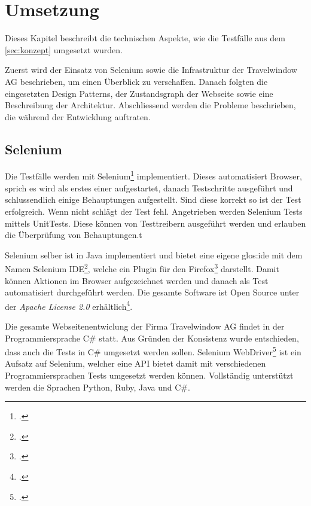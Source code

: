 

\chapter{Umsetzung}
\label{sec:umsetzung}

Dieses Kapitel beschreibt die technischen Aspekte, wie die Testfälle aus dem \cref{sec:konzept}  umgesetzt wurden.

Zuerst wird der Einsatz von Selenium sowie die Infrastruktur der Travelwindow AG beschrieben, um einen Überblick zu verschaffen. Danach folgten die eingesetzten Design Patterns, der Zustandsgraph der Webseite sowie eine Beschreibung der Architektur. Abschliessend werden die Probleme beschrieben, die während der Entwicklung auftraten.

\section{Selenium}
\label{sec:umsetzung:selenium}
Die Testfälle werden mit Selenium\footcite{Selenium_-_Web_Browser_Automation_2015-09-26} implementiert. Dieses automatisiert Browser, sprich es wird als erstes einer aufgestartet, danach Testschritte ausgeführt und schlussendlich einige Behauptungen aufgestellt. Sind diese korrekt so ist der Test erfolgreich. Wenn nicht schlägt der Test fehl. 
Angetrieben werden Selenium Tests mittels UnitTests. Diese können von Testtreibern ausgeführt werden und erlauben die Überprüfung von Behauptungen.t

Selenium selber ist in Java implementiert und bietet eine eigene \Gls{glos:ide} mit dem Namen Selenium IDE\footcite{Selenium_IDE_Plugins_2015-09-26}, welche ein Plugin für den Firefox\footcite{Download_Firefox__Free_Web_Browser__Mozilla_2015-09-26} darstellt. Damit können Aktionen im Browser aufgezeichnet werden und danach als Test automatisiert durchgeführt werden. Die gesamte Software ist Open Source unter der \textit{Apache License 2.0} erhältlich\footcite{Selenium_software_-_Wikipedia,_the_free_encyclopedia_2015-09-26}.

Die gesamte Webseitenentwiclung der Firma Travelwindow AG findet in der Programmiersprache C\# statt. Aus Gründen der Konsistenz wurde entschieden, dass auch die Tests in C\# umgesetzt werden sollen. 
Selenium WebDriver\footcite{Selenium_WebDriver_2015-09-26} ist ein Aufsatz auf Selenium, welcher eine API bietet damit mit verschiedenen Programmiersprachen Tests umgesetzt werden können. Vollständig unterstützt werden die Sprachen Python, Ruby, Java und C\#. 


